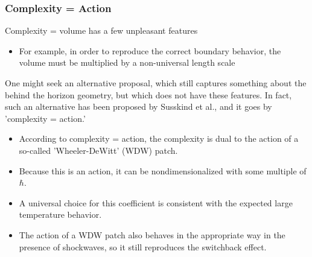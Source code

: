 \documentclass[8pt,aspectratio=169]{beamer}
\begin{document}
\begin{frame}
\frametitle{Complexity = Action}

Complexity = volume has a few unpleasant features

\begin{itemize}

\item For example, in order to reproduce the correct boundary behavior, the volume must be multiplied by a non-universal length scale

\end{itemize}

One might seek an alternative proposal, which still captures something about the behind the horizon geometry, but which does not have these features. In fact, such an alternative has been proposed by Susskind et al., and it goes by 'complexity = action.'

\begin{itemize}

\item According to complexity = action, the complexity is dual to the action of a so-called 'Wheeler-DeWitt' (WDW) patch.

\item Because this is an action, it can be nondimensionalized with some multiple of $\hbar$. 

\item A universal choice for this coefficient is consistent with the expected large temperature behavior. 

\item The action of a WDW patch also behaves in the appropriate way in the presence of shockwaves, so it still reproduces the switchback effect.

\end{itemize}

\end{frame}
\end{document}

